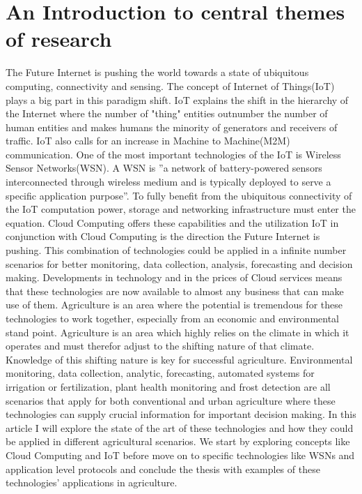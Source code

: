 \documentclass[]{uiophd}
\begin{document}
\section{An Introduction to central themes of research}
The Future Internet is pushing the world towards a state of ubiquitous computing, connectivity and sensing. The concept of Internet of Things(IoT) plays a big part in this paradigm shift. IoT explains the shift in the hierarchy of the Internet where the number of "thing" entities outnumber the number of human entities and makes humans the minority of generators and receivers of traffic. IoT also calls for an increase in Machine to Machine(M2M) communication. One of the most important technologies of the IoT is Wireless Sensor Networks(WSN). A WSN is ''a network of battery-powered sensors interconnected through wireless medium and is typically deployed to serve a specific application purpose''\parencite{Ojha2015662}. To fully benefit from the ubiquitous connectivity of the IoT computation power, storage and networking infrastructure must enter the equation. Cloud Computing offers these capabilities and the utilization IoT in conjunction with Cloud Computing is the direction the Future Internet is pushing. This combination of technologies could be applied in a infinite number scenarios for better monitoring, data collection, analysis, forecasting and decision making. Developments in technology and in the prices of Cloud services means that these technologies are now available to almost any business that can make use of them. Agriculture is an area where the potential is tremendous for these technologies to work together, especially from an economic and environmental stand point. Agriculture is an area which highly relies on the climate in which it operates and must therefor adjust to the shifting nature of that climate. Knowledge of this shifting nature is key for successful agriculture. Environmental monitoring, data collection, analytic, forecasting, automated systems for irrigation or fertilization, plant health monitoring and frost detection are all scenarios that apply for both conventional and urban agriculture where these technologies can supply crucial information for important decision making. In this article I will explore the state of the art of these technologies and how they could be applied in different agricultural scenarios. We start by exploring concepts like Cloud Computing and IoT before move on to specific technologies like WSNs and application level protocols and conclude the thesis with examples of these technologies' applications in agriculture.
\end{document}
